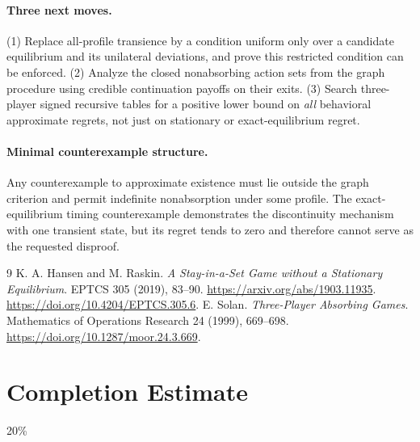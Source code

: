 \documentclass[11pt,a4paper]{article}
\theoremstyle{definition}
\theoremstyle{remark}
\begin{document}
\paragraph{Three next moves.}
(1) Replace all-profile transience by a condition uniform only over a candidate equilibrium and its unilateral deviations, and prove this restricted condition can be enforced. (2) Analyze the closed nonabsorbing action sets from the graph procedure using credible continuation payoffs on their exits. (3) Search three-player signed recursive tables for a positive lower bound on \emph{all} behavioral approximate regrets, not just on stationary or exact-equilibrium regret.

\paragraph{Minimal counterexample structure.}
Any counterexample to approximate existence must lie outside the graph criterion and permit indefinite nonabsorption under some profile. The exact-equilibrium timing counterexample demonstrates the discontinuity mechanism with one transient state, but its regret tends to zero and therefore cannot serve as the requested disproof.

\begin{thebibliography}{9}
 K. A. Hansen and M. Raskin. \emph{A Stay-in-a-Set Game without a Stationary Equilibrium}. EPTCS 305 (2019), 83--90. \url{https://arxiv.org/abs/1903.11935}. \url{https://doi.org/10.4204/EPTCS.305.6}.
 E. Solan. \emph{Three-Player Absorbing Games}. Mathematics of Operations Research 24 (1999), 669--698. \url{https://doi.org/10.1287/moor.24.3.669}.
\end{thebibliography}

\section{Completion Estimate}
20\%
\end{document}
